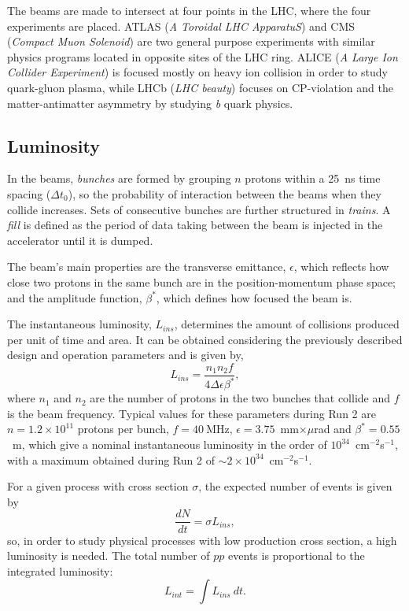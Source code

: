 \documentclass[../main.tex]{subfiles}
\begin{document}
The beams are made to intersect at four points in the LHC, where the four experiments are placed. ATLAS (\textit{A Toroidal LHC ApparatuS}) and CMS (\textit{Compact Muon Solenoid}) are two general purpose experiments with similar physics programs located in opposite sites of the LHC ring. ALICE (\textit{A Large Ion Collider Experiment}) is focused mostly on heavy ion collision in order to study quark-gluon plasma, while LHCb (\textit{LHC beauty}) focuses on CP-violation and the matter-antimatter asymmetry by studying \textit{b} quark physics.

\subsection{Luminosity}

In the beams, \textit{bunches} are formed by grouping $n$ protons within a 25~ns time spacing ($\Delta t_0$), so the probability of interaction between the beams when they collide increases. Sets of consecutive bunches are further structured in \textit{trains}. A \textit{fill} is defined as the period of data taking between the beam is injected in the accelerator until it is dumped. 

The beam's main properties are the transverse emittance, $\epsilon$, which reflects how close two protons in the same bunch are in the position-momentum phase space; and the amplitude function, $\beta^*$, which defines how focused the beam is.


The instantaneous luminosity, $L_{ins}$, determines the amount of collisions produced per unit of time and area. It can be obtained considering the previously described design and operation parameters and is given by,
\begin{equation}
L_{ins} = \frac{n_1 n_2 f}{4\Delta\epsilon\beta^*},
\label{intro:eq:lumi_inst}
\end{equation}
where $n_1$ and $n_2$ are the number of protons in the two bunches that collide and $f$ is the beam frequency. Typical values for these parameters during Run 2 are $n=1.2\times10^{11}$ protons per bunch, $f=40~$MHz, $\epsilon=3.75$~mm$\times\mu$rad and $\beta^*=0.55$~m, which give a nominal instantaneous luminosity in the order of $10^{34}$~cm${}^{-2}$s${}^{-1}$, with a maximum obtained during Run 2 of $\sim2\times10^{34}$~cm${}^{-2}$s${}^{-1}$. 

For a given process with cross section $\sigma$, the expected number of events is given by
\begin{equation}
\frac{dN}{dt} = \sigma L_{ins},
\end{equation}
so, in order to study physical processes with low production cross section, a high luminosity is needed. The total number of $pp$ events is proportional to the integrated luminosity:
\begin{equation}
L_{int} = \int L_{ins}~dt.
\end{equation}
\end{document}
